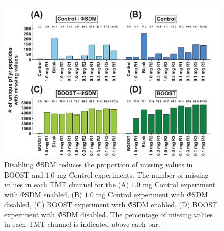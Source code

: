 \documentclass[journal=jprobs,manuscript=article]{achemso}
\begin{document}
\begin{figure}
\centering
\includegraphics[width=150mm]{figures/supplements/nancounts.pdf}
\caption{Disabling $\Phi$SDM reduces the proportion of missing values in BOOST and $1.0$ mg Control experiments. The number of missing values in each TMT channel for the (A) $1.0$ mg Control experiment with $\Phi$SDM enabled, (B) $1.0$ mg Control experiment with $\Phi$SDM disabled, (C) BOOST experiment with $\Phi$SDM enabled, (D) BOOST experiment with $\Phi$SDM disabled. The percentage of missing values in each TMT channel is indicated above each bar.}
\label{nancounts}
\end{figure}
\end{document}
